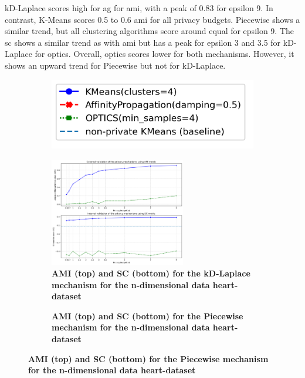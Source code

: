 kD-Laplace scores high for \gls{ag} for \gls{ami}, with a peak of 0.83 for epsilon 9.
In contrast, K-Means scores 0.5 to 0.6 \gls{ami} for all privacy budgets.
Piecewise shows a similar trend, but all clustering algorithms score around equal for epsilon 9.
The \gls{sc} shows a similar trend as with \gls{ami} but has a peak for epsilon 3 and 3.5 for kD-Laplace for \gls{optics}.
Overall, \gls{optics} scores lower for both mechanisms. However, it shows an upward trend for Piecewise but not for kD-Laplace.
\newpage
\begin{figure}[H]
    \centering
    \begin{subfigure}{0.30\textwidth}
        \includegraphics[width=\textwidth]{Results/2d-laplace/seeds-dataset/legend.png}
    \end{subfigure}
    \begin{subfigure}{1\textwidth}
        \caption{\textbf{AMI (top) and SC (bottom) for the kD-Laplace mechanism for the n-dimensional data heart-dataset}}
        \centering
        \includegraphics[width=0.65\textwidth]{Results/kd-laplace/kd-Laplace/heart-dataset/ami-and-sc_10_dimensions.png}
        \centering
    \end{subfigure}
    \begin{subfigure}{1\textwidth}
        \caption{\textbf{AMI (top) and SC (bottom) for the Piecewise mechanism for the n-dimensional data heart-dataset}}
        \centering

\end{subfigure}
\end{figure}
